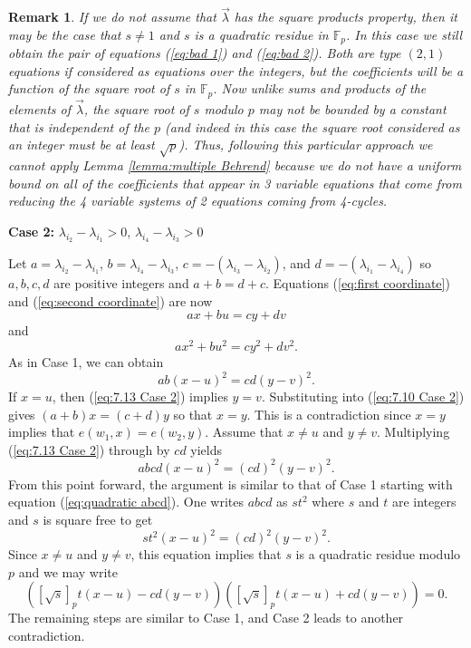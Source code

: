 \documentclass[12pt]{article}%
\newtheorem{remark}[theorem]{Remark}
\newcommand{\coeff}[2]{( \lambda_{i_#1} - \lambda_{i_#2} ) }
\newcommand{\coeffnp}[2]{ \lambda_{i_#1} - \lambda_{i_#2}  }
\begin{document}
 \begin{remark}\label{remark: subtlety}
     If we do not assume that $\vec{\lambda}$ has the square products property, then it may be the case that $s\not=1$ and $s$ is a quadratic residue in $\mathbb{F}_p$. In this case we still obtain the pair of equations (\ref{eq:bad 1}) and (\ref{eq:bad 2}). Both are type 
     $(2,1)$ equations if considered as equations over the integers, but the coefficients will be a function of the square root of $s$ in $\mathbb{F}_p$.  Now unlike sums and products of the elements of $\vec{ \lambda}$, 
     the square root of $s$ modulo $p$ may not be bounded by a constant that is independent of the $p$ (and indeed in this case the square root considered as an integer must be at least $\sqrt{p}$).  Thus, following this particular approach we cannot apply Lemma \ref{lemma:multiple Behrend} because we do not have a uniform bound on all of the coefficients that appear in 3 variable equations that come from reducing the 4 variable systems of 2 equations coming from 4-cycles.
 \end{remark}
\medskip

\noindent
\textbf{Case 2:} $\coeffnp{2}{1} > 0$, $\coeffnp{4}{3} > 0$

\smallskip

Let $a = \coeffnp{2}{1}$, $b = \coeffnp{4}{3}$, $c = -  \coeff{3}{2} $, and $d  = -  \coeff{1}{4} $ so 
$a,b,c,d$ are positive integers and $a  + b = d + c$.  Equations (\ref{eq:first 
 coordinate}) and (\ref{eq:second coordinate}) are now 
 \begin{equation}\label{eq:7.9 Case 2}
 a x + bu = c y + dv
 \end{equation}
 and 
 \begin{equation}\label{eq:7.10 Case 2}
 ax^2 + bu^2 = cy^2 + dv^2.
 \end{equation}
As in Case 1, we can obtain
 \begin{equation}\label{eq:7.13 Case 2}
 ab ( x- u )^2 = cd ( y - v)^2.
 \end{equation}
If $x = u$, then (\ref{eq:7.13 Case 2}) implies $y =v$.  Substituting into (\ref{eq:7.10 Case 2}) 
gives $(a+b)x = (c + d )y$ so that $x = y$.  This is a contradiction since $x = y$ implies that 
$e(w_1,x) = e(w_2,y)$.  
Assume that $x \neq u$ and $y \neq v$.  Multiplying (\ref{eq:7.13 Case 2}) through by $cd$ yields 
 \[
 abcd ( x - u)^2 = (cd)^2 ( y - v)^2.
 \]
From this point forward, the argument is similar to that of Case 1 starting with equation 
(\ref{eq:quadratic abcd}).  One writes $abcd$ as $st^2$ where $s$ and $t$ are integers and
$s$ is square free to get 
 \[
 s t^2 ( x- u )^2 = (cd)^2 ( y - v)^2.
 \]
 Since $x \neq u$ and $y \neq v$, this equation implies that $s$ is a quadratic residue modulo $p$ and we may write 
\[
\left(  [ \sqrt{s} ]_p t (x - u ) - cd ( y -v) \right) 
\left( [ \sqrt{s} ]_p t (x - u ) + cd ( y - v) \right) = 0.
\]
The remaining steps are similar to Case 1, and Case 2 leads to another contradiction.    
\end{document}
